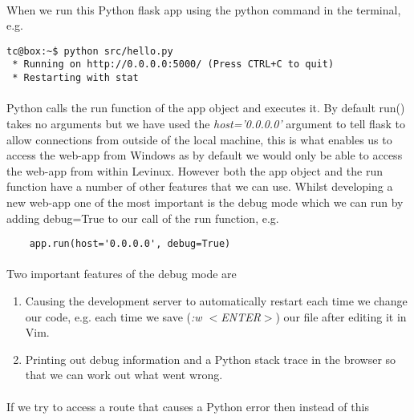 \documentclass[12pt, a4paper, twoside]{book}
\begin{document}
\paragraph{} When we run this Python flask app using the python command in the terminal, e.g.

\begin{lstlisting}[style=DOS]
tc@box:~$ python src/hello.py 
 * Running on http://0.0.0.0:5000/ (Press CTRL+C to quit)
 * Restarting with stat
\end{lstlisting}

\paragraph{} Python calls the run function of the app object and executes it. By default run() takes no arguments but we have used the \emph{host='0.0.0.0'} argument to tell flask to allow connections from outside of the local machine, this is what enables us to access the web-app from Windows as by default we would only be able to access the web-app from within Levinux. However both the app object and the run function have a number of other features that we can use. Whilst developing a new web-app one of the most important is the debug mode which we can run by adding debug=True to our call of the run function, e.g.

\begin{lstlisting}
    app.run(host='0.0.0.0', debug=True)
\end{lstlisting}

\paragraph{} Two important features of the debug mode are

\begin{enumerate}
\item Causing the development server to automatically restart each time we change our code, e.g. each time we save (\emph{:w $<$ENTER$>$}) our file after editing it in Vim.
\item Printing out debug information and a Python stack trace in the browser so that we can work out what went wrong.
\end{enumerate}

\paragraph{} If we try to access a route that causes a Python error then instead of this
\end{document}

